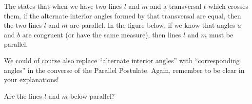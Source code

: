 \documentclass{ximera}
\begin{document}
\begin{definition}
The  states that when we have two lines $l$ and $m$ and a transversal $t$ which crosses them, if the alternate interior angles formed by that transversal are equal, then the two lines $l$ and $m$ are parallel. In the figure below, if we know that angles $a$ and $b$ are congruent (or have the same measure), then lines $l$ and $m$ must be parallel.

\begin{center}
\end{center}

\end{definition}

We could of course also replace ``alternate interior angles'' with ``corresponding angles'' in the converse of the Parallel Postulate. Again, remember to be clear in your explanations!

\begin{question}
Are the lines $l$ and $m$ below parallel?
\begin{center}
\end{center}

\begin{multipleChoice}
\end{multipleChoice}
\end{question}
\end{document}
